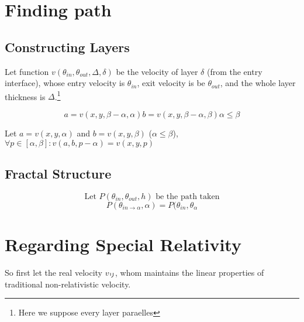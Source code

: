 \documentclass[preprint]{ptephy_v1}%
\begin{document}
\newpage
\section{Finding path}
\subsection{Constructing Layers}
Let function $v(\theta_{in}, \theta_{out}, \Delta, \delta)$ be the velocity of layer $\delta$ (from the entry interface), whose entry velocity is $\theta_{in}$, exit velocity is be $\theta_{out}$, and the whole layer thickness is $\Delta$.\footnote{Here we suppose every layer paraelles}


\begin{subequations}
\begin{equation}
a=v(x, y, \beta-\alpha, \alpha)
\end{equation}
\begin{equation}
b=v(x, y, \beta-\alpha, \beta)
\end{equation}
\begin{equation}
\alpha\leq\beta
\end{equation}
\end{subequations}

Let $a=v(x, y, \alpha)$ and $b=v(x, y, \beta)$ ($\alpha\leq\beta$), $\forall p\in[\alpha, \beta]: v(a, b, p-\alpha)=v(x, y, p)$

\subsection{Fractal Structure}
\begin{equation}
    \text{Let }P(\theta_{in}, \theta_{out}, h)\text{ be the path taken}
\end{equation}
\begin{equation}
    P(\theta_{in\to\alpha}, \alpha)=P(\theta_{in}, \theta_{\alpha}
\end{equation}


\newpage
\section{Regarding Special Relativity}
So first let the real velocity \(v_リ\), whom maintains the linear properties of traditional non-relativistic velocity.
\end{document}
